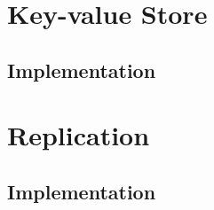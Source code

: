 \documentclass{report}
\begin{document}
	\chapter{Key-value Store}
	
	        \paragraph{}
	        
	        \paragraph{}

			\section{Implementation}
	
				\paragraph{}
				
				\paragraph{}
	
	\chapter{Replication}
	
	        \paragraph{}
	        
	        \paragraph{}

			\section{Implementation}
	
				\paragraph{}
				
				\paragraph{}
\end{document}
